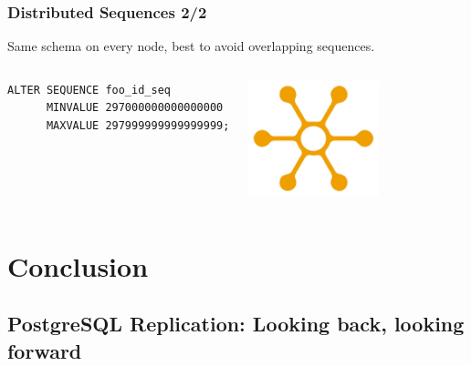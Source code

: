 \documentclass[english]{beamer}
\begin{document}
\begin{frame}[fragile]
  \frametitle{Distributed Sequences 2/2}

  Same schema on every node, best to avoid overlapping sequences.

\begin{columns}[c]

  \begin{example}
\begin{verbatim}
ALTER SEQUENCE foo_id_seq
      MINVALUE 297000000000000000
      MAXVALUE 297999999999999999;
\end{verbatim}
  \end{example}

\includegraphics[height=9em]{distribution.jpg}
\end{columns}

\end{frame}


\section{Conclusion}
\subsection{PostgreSQL Replication: Looking back, looking forward}
\frame{\tableofcontents[currentsubsection]}
\end{document}
